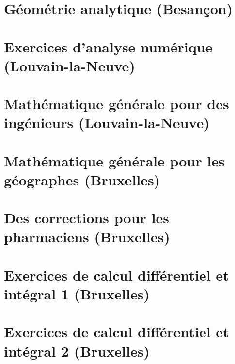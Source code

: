 
\chapter{Géométrie analytique (Besançon)}


\chapter{Exercices d'analyse numérique (Louvain-la-Neuve)}



\chapter{Mathématique générale pour des ingénieurs (Louvain-la-Neuve)}



\chapter{Mathématique générale pour les géographes (Bruxelles)}



\chapter{Des corrections pour les pharmaciens (Bruxelles)}


%


\chapter{Exercices de calcul différentiel et intégral 1 (Bruxelles)}










 
\chapter{Exercices de calcul différentiel et intégral 2 (Bruxelles)}




